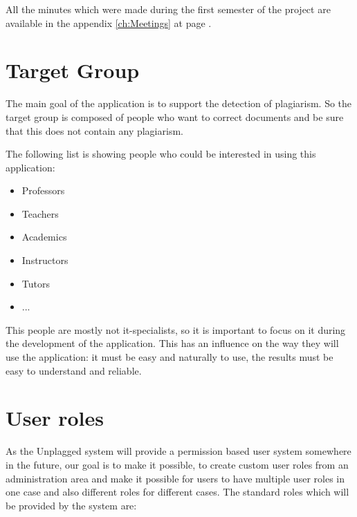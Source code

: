All the minutes which were made during the first semester of the project are available in the appendix \ref{ch:Meetings} 
at page \pageref{ch:Meetings}.

\section{Target Group}

The main goal of the application is to support the detection of plagiarism. So the target group is composed of people 
who want to correct documents and be sure that this does not contain any plagiarism.

The following list is showing people who could be interested in using this application:

\begin{itemize}
\item Professors 
\item Teachers
\item Academics
\item Instructors
\item Tutors
\item ...
\end{itemize}

This people are mostly not it-specialists, so it is important to focus on it during the development of the application. This has an influence on the way they will use the application: it must be easy and naturally to use, the results must be easy to understand and reliable.

\section{User roles}

As the Unplagged system will provide a permission based user system somewhere in the future, our goal is to make it 
possible, to create custom 
user roles from an administration area and make it possible for users to have multiple user roles in one case and also 
different roles for different cases.
The standard roles which will be provided by the system are:

